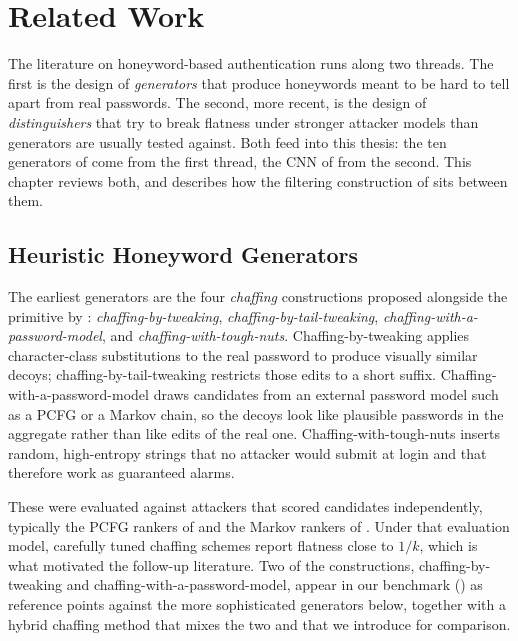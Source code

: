 \chapter{Related Work}
\label{ch:related}

The literature on honeyword-based authentication runs along two
threads. The first is the design of \emph{generators} that produce
honeywords meant to be hard to tell apart from real passwords. The
second, more recent, is the design of \emph{distinguishers} that try to
break flatness under stronger attacker models than generators are
usually tested against. Both feed into this thesis: the ten generators
of  come from the first thread, the CNN of
 from the second. This chapter reviews both, and
 describes how the filtering construction of
 sits between them.

\section{Heuristic Honeyword Generators}
\label{sec:related-heuristic}

The earliest generators are the four \emph{chaffing} constructions
proposed alongside the primitive by \textcite{juels2013honeywords}:
\emph{chaffing-by-tweaking}, \emph{chaffing-by-tail-tweaking},
\emph{chaffing-with-a-password-model}, and
\emph{chaffing-with-tough-nuts}. Chaffing-by-tweaking applies
character-class substitutions to the real password to produce visually
similar decoys; chaffing-by-tail-tweaking restricts those edits to a
short suffix. Chaffing-with-a-password-model draws candidates from an
external password model such as a PCFG or a Markov chain, so the decoys
look like plausible passwords in the aggregate rather than like edits of
the real one. Chaffing-with-tough-nuts inserts random, high-entropy
strings that no attacker would submit at login and that therefore work
as guaranteed alarms.

These were evaluated against attackers that scored candidates
independently, typically the PCFG rankers of \textcite{weir2009pcfg} and
the Markov rankers of \textcite{narayanan2005fast}. Under that
evaluation model, carefully tuned chaffing schemes report flatness close
to $1/k$, which is what motivated the follow-up literature. Two of the
constructions, chaffing-by-tweaking and chaffing-with-a-password-model,
appear in our benchmark () as reference points
against the more sophisticated generators below, together with a hybrid
chaffing method that mixes the two and that we introduce for comparison.

